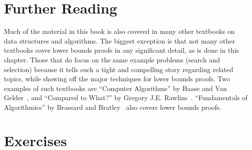 \section{Further Reading}

Much of the material in this book is also covered in many other
textbooks on data structures and algorithms.
The biggest exception is that not many other textbooks cover lower
bounds proofs in any significant detail, as is done in this chapter.
Those that do focus on the same example problems (search and
selection) because it tells such a tight and compelling story
regarding related topics, while showing off the major techniques for
lower bounds proofs.
Two examples of such textbooks are
``Computer Algorithms'' by Baase and Van Gelder~\cite{Baase},
and ``Compared to What?'' by Gregory J.E. Rawlins~\cite{Rawlins}.
``Fundamentals of Algorithmics'' by Brassard and Bratley~\cite{BB}
also covers lower bounds proofs.

\section{Exercises}

